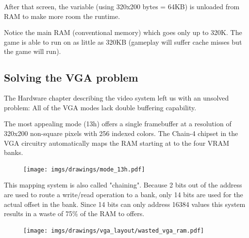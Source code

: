 \documentclass[book.tex]{subfiles}
\begin{document}
After that screen, the  variable (using 320x200 bytes = 64KB) is unloaded from RAM to make more room the runtime.\\
\par
Notice the main RAM (conventional memory) which goes only up to 320K. The game is able to run on as little as 320KB (gameplay will suffer cache misses but the game will run).




















\subsection{Solving the VGA problem}
The Hardware chapter describing the video system left us with an unsolved problem: All of the VGA modes lack double buffering capability.\\
\par
 The most appealing mode (13h) offers a single framebuffer at a resolution of 320x200 non-square pixels with 256 indexed colors. The Chain-4 chipset in the VGA circuitry automatically maps the RAM starting at  to the four VRAM banks. 
 \par
 \begin{figure}[H]
\centering
      \texttt{[image: imgs/drawings/mode\_13h.pdf]}
\end{figure}

This mapping system is also called "chaining". Because 2 bits out of the address are used to route a write/read operation to a bank, only 14 bits are used for the actual offset in the bank. Since 14 bits can only address 16384 values this system results in a waste of 75\% of the RAM to offers.\\

\begin{figure}[H]
\centering
 \texttt{[image: imgs/drawings/vga\_layout/wasted\_vga\_ram.pdf]}
 \end{figure}
\end{document}
